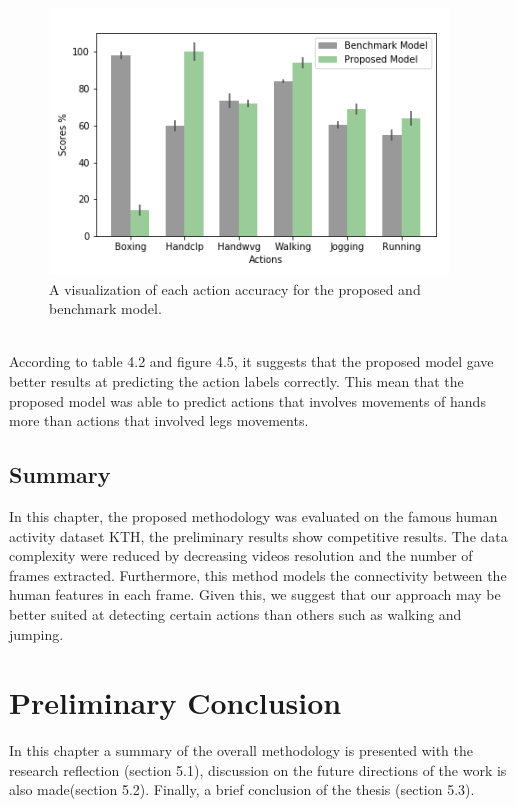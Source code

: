 \begin{figure}[ht]
    \centering
    \includegraphics{Figures/modelcomparison.png}
    \decoRule
    \caption [A visualization of each action accuracy for the proposed and benchmark model.]{A visualization of each action accuracy for the proposed and benchmark model.}
    \label{fig:la}
    \end{figure}\\
    \newpage
    According to table 4.2 and figure 4.5, it suggests that the proposed model gave better results at predicting the action labels correctly. This mean that the proposed model was able to predict actions that involves movements of hands more than actions that involved legs movements.
   

\subsection{Summary}
\hspace{5mm} In this chapter, the proposed methodology was evaluated on the famous human activity dataset KTH, the preliminary results show competitive results. The data complexity were reduced by decreasing videos resolution and the number of frames extracted. Furthermore, this method models the connectivity between the human features in each frame. Given this, we suggest that our approach may be better suited at detecting certain actions than others such as walking and jumping.
\section{Preliminary Conclusion}
\hspace{5mm} In this chapter a summary of the overall methodology is presented with the research reflection (section 5.1), discussion on the future directions of the work is also made(section 5.2). Finally, a brief conclusion of the thesis (section 5.3).
